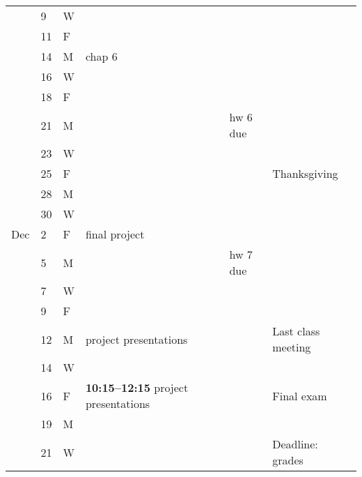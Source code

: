 \documentclass{article}
\begin{document}
\begin{tabular*}{0.99\textwidth}{%
    p{}%
    p{}%
    p{}%
    |p{}%
    |p{}%
    |p{}%
    |p{}}
& 9 & W & & & & \\
& 11 & F & & & & \\
\hline
& 14 & M & chap 6& & & \\
& 16 & W & & & & \\
& 18 & F & & & & \\
\hline
& 21 & M & & & hw 6 due&\\
& 23 & W & & & & \\
& 25 & F & & & & Thanksgiving\\
\hline
& 28 & M & & & & \\
& 30 & W & & & & \\
Dec
& 2 & F & final project& & & \\
\hline
& 5 & M & & & hw 7 due&\\
& 7 & W & & & & \\
& 9 & F & & & & \\
\hline
& 12 & M & project presentations& & & Last class meeting\\
& 14 & W & & & & \\
& 16 & F & \textbf{10:15--12:15} project presentations& & & Final exam\\
\hline
& 19 & M & & & & \\
& 21 & W & & & & Deadline: grades\\
\end{tabular*}
\end{document}
